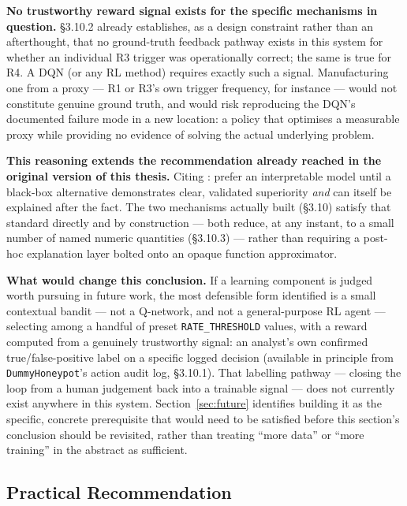 \textbf{No trustworthy reward signal exists for the specific mechanisms in
question.}
\S3.10.2 already establishes, as a design constraint rather than an
afterthought, that no ground-truth feedback pathway exists in this system
for whether an individual R3 trigger was operationally correct; the same is
true for R4.
A DQN (or any RL method) requires exactly such a signal.
Manufacturing one from a proxy --- R1 or R3's own trigger frequency, for
instance --- would not constitute genuine ground truth, and would risk
reproducing the DQN's documented failure mode in a new location: a policy
that optimises a measurable proxy while providing no evidence of solving
the actual underlying problem.

\textbf{This reasoning extends the recommendation already reached in the
original version of this thesis.}
Citing \citet{rudin2019stop}: prefer an interpretable model until a
black-box alternative demonstrates clear, validated superiority \emph{and}
can itself be explained after the fact.
The two mechanisms actually built (\S3.10) satisfy that standard directly
and by construction --- both reduce, at any instant, to a small number of
named numeric quantities (\S3.10.3) --- rather than requiring a post-hoc
explanation layer bolted onto an opaque function approximator.

\textbf{What would change this conclusion.}
If a learning component is judged worth pursuing in future work, the most
defensible form identified is a small contextual bandit --- not a
Q-network, and not a general-purpose RL agent --- selecting among a handful
of preset \texttt{RATE\_THRESHOLD} values, with a reward computed from a
genuinely trustworthy signal: an analyst's own confirmed true/false-positive
label on a specific logged decision (available in principle from
\texttt{DummyHoneypot}'s action audit log, \S3.10.1).
That labelling pathway --- closing the loop from a human judgement back
into a trainable signal --- does not currently exist anywhere in this
system.
Section~\ref{sec:future} identifies building it as the specific, concrete
prerequisite that would need to be satisfied before this section's
conclusion should be revisited, rather than treating ``more data'' or
``more training'' in the abstract as sufficient.

\subsection{Practical Recommendation}

